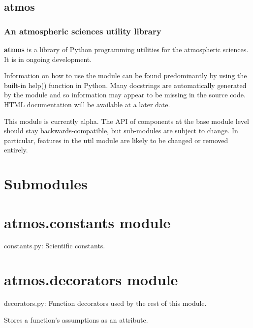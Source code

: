 \documentclass[letterpaper,10pt,english]{sphinxmanual}
\begin{document}
\subsection{atmos}
\label{atmos:atmos}

\subsubsection{An atmospheric sciences utility library}
\label{atmos:an-atmospheric-sciences-utility-library}
\textbf{atmos} is a library of Python programming utilities for the atmospheric
sciences. It is in ongoing development.

Information on how to use the module can be found predominantly by using the
built-in help() function in Python. Many docstrings are automatically
generated by the module and so information may appear to be missing in the
source code. HTML documentation will be available at a later date.

This module is currently alpha. The API of components at the base module
level should stay backwards-compatible, but sub-modules are subject to change.
In particular, features in the util module are likely to be changed or removed
entirely.


\section{Submodules}
\label{atmos:submodules}

\section{atmos.constants module}
\label{atmos:atmos-constants-module}\label{atmos:module-atmos.constants}
constants.py: Scientific constants.


\section{atmos.decorators module}
\label{atmos:module-atmos.decorators}\label{atmos:atmos-decorators-module}
decorators.py: Function decorators used by the rest of this module.

\begin{fulllineitems}
\label{atmos:atmos.decorators.assumes}
Stores a function's assumptions as an attribute.

\end{fulllineitems}
\end{document}
